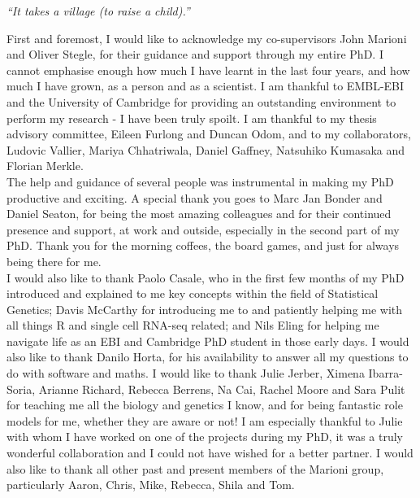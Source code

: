 
\begin{acknowledgements}      

\textit{“It takes a village (to raise a child).”}\\

\vspace{5mm}

First and foremost, I would like to acknowledge my co-supervisors John Marioni and Oliver Stegle, for their guidance and support through my entire PhD.
I cannot emphasise enough how much I have learnt in the last four years, and how much I have grown, as a person and as a scientist.
I am thankful to EMBL-EBI and the University of Cambridge for providing an outstanding environment to perform my research - I have been truly spoilt.
I am thankful to my thesis advisory committee, Eileen Furlong and Duncan Odom, and to my collaborators, Ludovic Vallier, Mariya Chhatriwala, Daniel Gaffney, Natsuhiko Kumasaka and Florian Merkle. \\

The help and guidance of several people was instrumental in making my PhD productive and exciting.
A special thank you goes to Marc Jan Bonder and Daniel Seaton, for being the most amazing colleagues and for their continued presence and support, at work and outside, especially in the second part of my PhD. 
Thank you for the morning coffees, the board games, and just for always being there for me. \\

I would also like to thank Paolo Casale, who in the first few months of my PhD introduced and explained to me key concepts within the field of Statistical Genetics; Davis McCarthy for introducing me to and patiently helping me with all things R and single cell RNA-seq related; and Nils Eling for helping me navigate life as an EBI and Cambridge PhD student in those early days.
I would also like to thank Danilo Horta, for his availability to answer all my questions to do with software and maths.
I would like to thank Julie Jerber, Ximena Ibarra-Soria, Arianne Richard, Rebecca Berrens, Na Cai, Rachel Moore and Sara Pulit for teaching me all the biology and genetics I know, and for being fantastic role models for me, whether they are aware or not!
I am especially thankful to Julie with whom I have worked on one of the projects during my PhD, it was a truly wonderful collaboration and I could not have wished for a better partner.
I would also like to thank all other past and present members of the Marioni group, particularly Aaron, Chris, Mike, Rebecca, Shila and Tom. \\


\end{acknowledgements}
